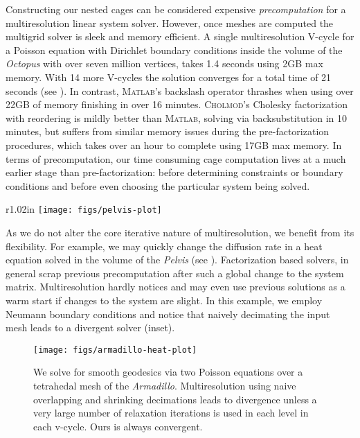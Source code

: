 %
Constructing our nested cages can be considered expensive \emph{precomputation}
for a multiresolution linear system solver.
%
However, once meshes are computed the multigrid solver is sleek and memory
efficient.
%
A single multiresolution V-cycle for a Poisson equation with Dirichlet boundary
conditions inside the volume of the \emph{Octopus} with over seven million
vertices, takes 1.4 seconds using 2GB max memory. With 14 more V-cycles the
solution converges for a total time of 21 seconds (see
).
%
In contrast, \textsc{Matlab}'s backslash operator thrashes when using over 22GB
of memory finishing in over 16 minutes.
%
\textsc{Cholmod}'s Cholesky factorization with reordering is mildly better than
\textsc{Matlab}, solving via backsubstitution in 10 minutes, but suffers from
similar memory issues during the pre-factorization procedures, which takes over
an hour to complete using 17GB max memory.
%
In terms of precomputation, our time consuming cage computation lives at a much
earlier stage than pre-factorization: before determining constraints or
boundary conditions and before even choosing the particular system being
solved.

\begin{wrapfigure}{r}{1.02in}
%
\centering
%
\texttt{[image: figs/pelvis-plot]}
%
\end{wrapfigure}
%
As we do not alter the core iterative nature of multiresolution, we benefit
from its flexibility. For example, we may quickly change the diffusion rate in
a heat equation solved in the volume of the \emph{Pelvis} (see
). 
%
Factorization based solvers, in general scrap previous precomputation after
such a global change to the system matrix. 
%
Multiresolution hardly notices and may even use previous solutions as a warm
start if changes to the system are slight.
%
In this example, we employ Neumann boundary conditions and notice that naively
decimating the input mesh leads to a divergent solver (inset).

\begin{figure}
  \texttt{[image: figs/armadillo-heat-plot]}
  \caption{We solve for smooth geodesics via two Poisson equations over a
  tetrahedal mesh of the \emph{Armadillo}. Multiresolution using naive
  overlapping and shrinking decimations leads to divergence unless a very large
  number of relaxation iterations is used in each level in each v-cycle. Ours
  is always convergent.}
  \label{fig:armadillo-heat-plot}
\end{figure}

